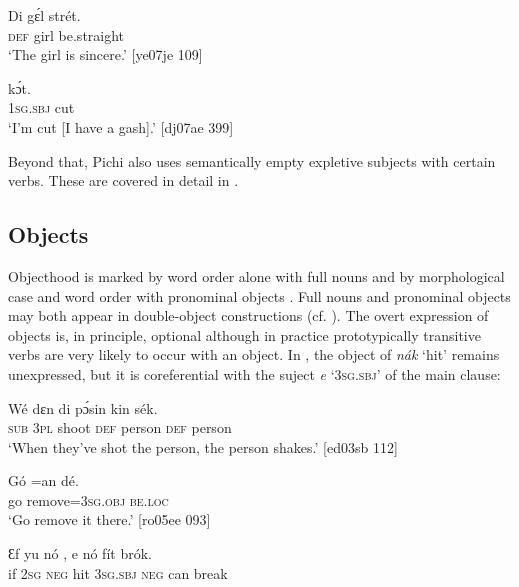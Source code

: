 \ea%
    \label{ex:key:1043}
    \gll Di  gɛ́l  strét.\\
\textsc{def}  girl  be.straight\\

\glt ‘The girl is sincere.’ [ye07je 109]
\z


\ea%
    \label{ex:key:1044}
    \gll {}    kɔ́t.\\
\textsc{1sg.sbj}  cut\\

\glt ‘I’m cut [I have a gash].’ [dj07ae 399]
\z

Beyond that, Pichi also uses semantically empty expletive subjects with certain verbs. These are covered in detail in .

\subsection{Objects}

Objecthood is marked by word order alone with full nouns  and by morphological case and word order with pronominal objects . Full nouns and pronominal objects may both appear in double-object constructions (cf. ). The overt expression of objects is, in principle, optional although in practice prototypically transitive verbs are very likely to occur with an object. In , the object of \textit{nák} ‘hit’ remains unexpressed, but it is coreferential with the suject \textit{e} ‘\textsc{3sg.sbj}’ of the main clause: 


\ea%
    \label{ex:key:1045}
    \gll Wé  dɛn          di  pɔ́sin  kin  sék.\\
\textsc{sub}  \textsc{3pl}  shoot  \textsc{def}  person  \textsc{def}  person  \\

\glt ‘When they’ve shot the person, the person shakes.’ [ed03sb 112]
\z


\ea%
    \label{ex:key:1046}
    \gll Gó  =an      dé.\\
go  remove=\textsc{3sg.obj}  \textsc{be.loc}\\

\glt ‘Go remove it there.’ [ro05ee 093]
\z


\ea%
    \label{ex:key:1047}
    \gll Ɛf  yu  nó  ,    e    nó  fít  brók.\\
if  \textsc{2sg}  \textsc{neg}  hit    \textsc{3sg.sbj}  \textsc{neg}  can  break\\

